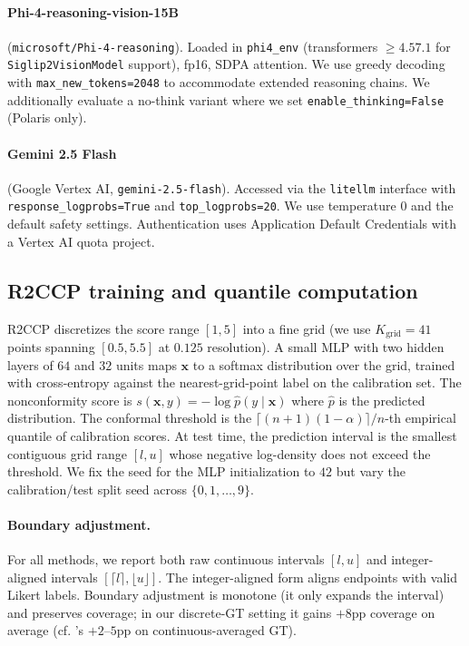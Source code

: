 \documentclass{article}
\begin{document}
\paragraph{Phi-4-reasoning-vision-15B} (\texttt{microsoft/Phi-4-reasoning}). Loaded in \texttt{phi4\_env} (transformers $\geq 4.57.1$ for \texttt{Siglip2VisionModel} support), fp16, SDPA attention. We use greedy decoding with \texttt{max\_new\_tokens=2048} to accommodate extended reasoning chains. We additionally evaluate a no-think variant where we set \texttt{enable\_thinking=False} (Polaris only).

\paragraph{Gemini 2.5 Flash} (Google Vertex AI, \texttt{gemini-2.5-flash}). Accessed via the \texttt{litellm} interface with \texttt{response\_logprobs=True} and \texttt{top\_logprobs=20}. We use temperature $0$ and the default safety settings. Authentication uses Application Default Credentials with a Vertex AI quota project.

\subsection{R2CCP training and quantile computation}
\label{app:r2ccp_train}

R2CCP discretizes the score range $[1, 5]$ into a fine grid (we use $K_{\text{grid}} = 41$ points spanning $[0.5, 5.5]$ at $0.125$ resolution). A small MLP with two hidden layers of $64$ and $32$ units maps $\mathbf{x}$ to a softmax distribution over the grid, trained with cross-entropy against the nearest-grid-point label on the calibration set. The nonconformity score is $s(\mathbf{x}, y) = -\log \hat{p}(y \mid \mathbf{x})$ where $\hat{p}$ is the predicted distribution. The conformal threshold is the $\lceil (n+1)(1-\alpha) \rceil / n$-th empirical quantile of calibration scores. At test time, the prediction interval is the smallest contiguous grid range $[l, u]$ whose negative log-density does not exceed the threshold. We fix the seed for the MLP initialization to $42$ but vary the calibration/test split seed across $\{0, 1, \dots, 9\}$.

\paragraph{Boundary adjustment.}
For all methods, we report both raw continuous intervals $[l, u]$ and integer-aligned intervals $[\lceil l \rceil, \lfloor u \rfloor]$. The integer-aligned form aligns endpoints with valid Likert labels. Boundary adjustment is monotone (it only expands the interval) and preserves coverage; in our discrete-GT setting it gains $+8$pp coverage on average (cf. \citealp{sheng2025analyzing}'s $+2$--$5$pp on continuous-averaged GT).
\end{document}
